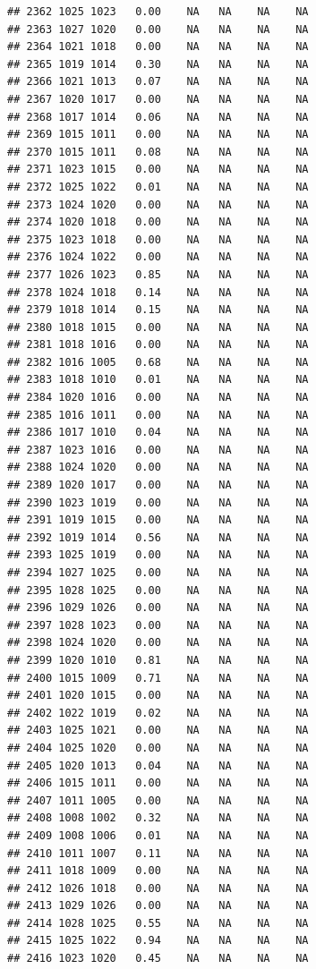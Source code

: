 \documentclass{article}\usepackage{graphicx, color}
\makeatletter
\newenvironment{kframe}{%
 \def\at@end@of@kframe{}%
 \ifinner\ifhmode%
  \def\at@end@of@kframe{\end{minipage}}%
  \begin{minipage}{\columnwidth}%
 \fi\fi%
 \def\FrameCommand##1{\hskip\@totalleftmargin \hskip-\fboxsep
 \colorbox{shadecolor}{##1}\hskip-\fboxsep
     \hskip-\linewidth \hskip-\@totalleftmargin \hskip\columnwidth}%
 \MakeFramed {\advance\hsize-\width
   \@totalleftmargin\z@ \linewidth\hsize
   \@setminipage}}%
 {\par\unskip\endMakeFramed%
 \at@end@of@kframe}
\newenvironment{knitrout}{}{} %
\makeatother
\begin{document}
\begin{knitrout}
\begin{kframe}
\begin{verbatim}
## 2362 1025 1023   0.00    NA   NA    NA    NA
## 2363 1027 1020   0.00    NA   NA    NA    NA
## 2364 1021 1018   0.00    NA   NA    NA    NA
## 2365 1019 1014   0.30    NA   NA    NA    NA
## 2366 1021 1013   0.07    NA   NA    NA    NA
## 2367 1020 1017   0.00    NA   NA    NA    NA
## 2368 1017 1014   0.06    NA   NA    NA    NA
## 2369 1015 1011   0.00    NA   NA    NA    NA
## 2370 1015 1011   0.08    NA   NA    NA    NA
## 2371 1023 1015   0.00    NA   NA    NA    NA
## 2372 1025 1022   0.01    NA   NA    NA    NA
## 2373 1024 1020   0.00    NA   NA    NA    NA
## 2374 1020 1018   0.00    NA   NA    NA    NA
## 2375 1023 1018   0.00    NA   NA    NA    NA
## 2376 1024 1022   0.00    NA   NA    NA    NA
## 2377 1026 1023   0.85    NA   NA    NA    NA
## 2378 1024 1018   0.14    NA   NA    NA    NA
## 2379 1018 1014   0.15    NA   NA    NA    NA
## 2380 1018 1015   0.00    NA   NA    NA    NA
## 2381 1018 1016   0.00    NA   NA    NA    NA
## 2382 1016 1005   0.68    NA   NA    NA    NA
## 2383 1018 1010   0.01    NA   NA    NA    NA
## 2384 1020 1016   0.00    NA   NA    NA    NA
## 2385 1016 1011   0.00    NA   NA    NA    NA
## 2386 1017 1010   0.04    NA   NA    NA    NA
## 2387 1023 1016   0.00    NA   NA    NA    NA
## 2388 1024 1020   0.00    NA   NA    NA    NA
## 2389 1020 1017   0.00    NA   NA    NA    NA
## 2390 1023 1019   0.00    NA   NA    NA    NA
## 2391 1019 1015   0.00    NA   NA    NA    NA
## 2392 1019 1014   0.56    NA   NA    NA    NA
## 2393 1025 1019   0.00    NA   NA    NA    NA
## 2394 1027 1025   0.00    NA   NA    NA    NA
## 2395 1028 1025   0.00    NA   NA    NA    NA
## 2396 1029 1026   0.00    NA   NA    NA    NA
## 2397 1028 1023   0.00    NA   NA    NA    NA
## 2398 1024 1020   0.00    NA   NA    NA    NA
## 2399 1020 1010   0.81    NA   NA    NA    NA
## 2400 1015 1009   0.71    NA   NA    NA    NA
## 2401 1020 1015   0.00    NA   NA    NA    NA
## 2402 1022 1019   0.02    NA   NA    NA    NA
## 2403 1025 1021   0.00    NA   NA    NA    NA
## 2404 1025 1020   0.00    NA   NA    NA    NA
## 2405 1020 1013   0.04    NA   NA    NA    NA
## 2406 1015 1011   0.00    NA   NA    NA    NA
## 2407 1011 1005   0.00    NA   NA    NA    NA
## 2408 1008 1002   0.32    NA   NA    NA    NA
## 2409 1008 1006   0.01    NA   NA    NA    NA
## 2410 1011 1007   0.11    NA   NA    NA    NA
## 2411 1018 1009   0.00    NA   NA    NA    NA
## 2412 1026 1018   0.00    NA   NA    NA    NA
## 2413 1029 1026   0.00    NA   NA    NA    NA
## 2414 1028 1025   0.55    NA   NA    NA    NA
## 2415 1025 1022   0.94    NA   NA    NA    NA
## 2416 1023 1020   0.45    NA   NA    NA    NA

\end{verbatim}
\end{kframe}
\end{knitrout}
\end{document}
